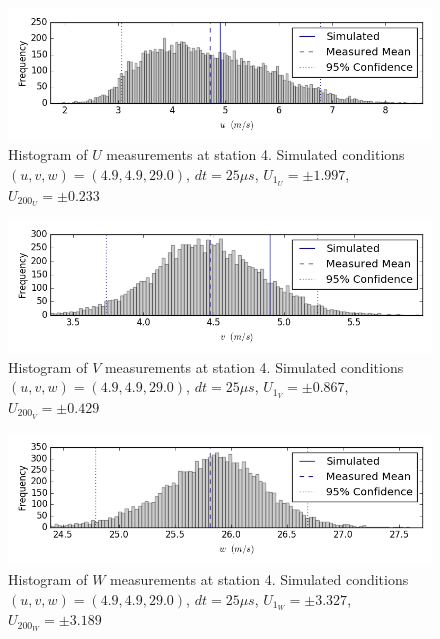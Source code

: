 \begin{figure}[H]
\centering
\includegraphics[width=6in]{figs/Ely_May28th04001/uncertainty_Ely_May28th04001_U}
\caption{Histogram of $U$ measurements at station 4. Simulated conditions $(u,v,w)=(4.9, 4.9, 29.0)$, $dt=25 \mu s$, $U_1_U=\pm 1.997$, $U_200_U=\pm 0.233$}
\label{fig:uncertainty_Ely_May28th04001_U}
\end{figure}


\begin{figure}[H]
\centering
\includegraphics[width=6in]{figs/Ely_May28th04001/uncertainty_Ely_May28th04001_V}
\caption{Histogram of $V$ measurements at station 4. Simulated conditions $(u,v,w)=(4.9, 4.9, 29.0)$, $dt=25 \mu s$, $U_1_V=\pm 0.867$, $U_200_V=\pm 0.429$}
\label{fig:uncertainty_Ely_May28th04001_V}
\end{figure}


\begin{figure}[H]
\centering
\includegraphics[width=6in]{figs/Ely_May28th04001/uncertainty_Ely_May28th04001_W}
\caption{Histogram of $W$ measurements at station 4. Simulated conditions $(u,v,w)=(4.9, 4.9, 29.0)$, $dt=25 \mu s$, $U_1_W=\pm 3.327$, $U_200_W=\pm 3.189$}
\label{fig:uncertainty_Ely_May28th04001_W}
\end{figure}


